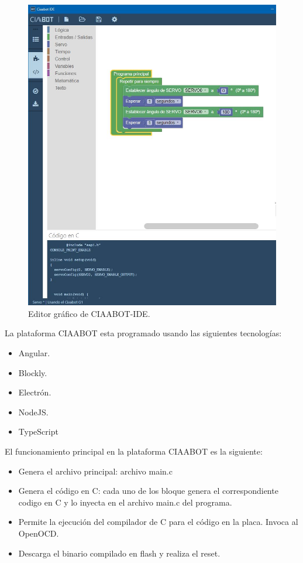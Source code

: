\begin{figure}[h]
	\centering
	\includegraphics[scale=.30]{./Figures/ciaabot-ide-bloques.JPG}
	\caption{Editor gráfico de CIAABOT-IDE.}
	\label{fig:ciaabot-ide-bloques}
\end{figure}

La plataforma CIAABOT esta programado usando las siguientes tecnologías:

\begin{itemize}
	\item Angular\citep{angular}.
	\item Blockly\citep{blockly}.
	\item Electrón\citep{electron}.
	\item NodeJS\citep{nodejs}.
	\item TypeScript\citep{typescript}
\end{itemize}

El funcionamiento principal en la plataforma CIAABOT es la siguiente:

\begin{itemize}
	\item Genera el archivo principal: archivo main.c
	\item Genera el código en C: cada uno de los bloque genera el correspondiente codigo en C y lo inyecta en el archivo main.c del programa.
	\item Permite la ejecución del compilador de C para el código en la placa.
	Invoca al OpenOCD.
	\item Descarga el binario compilado en flash y realiza el reset.
\end{itemize}

